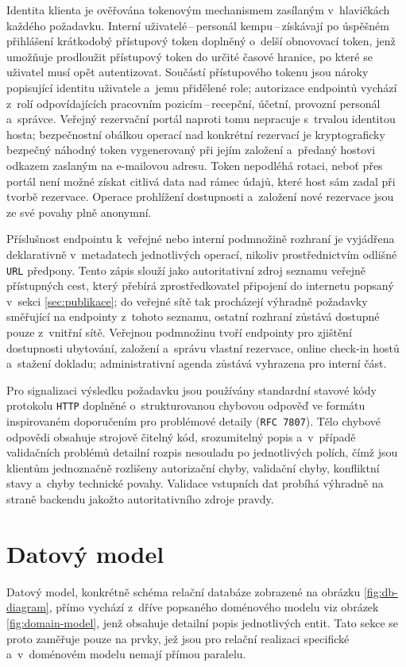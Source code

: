 Identita klienta je ověřována tokenovým mechanismem zasílaným v~hlavičkách každého požadavku.
Interní uživatelé\,--\,personál kempu\,--\,získávají po úspěšném přihlášení krátkodobý přístupový token doplněný o~delší obnovovací token, jenž umožňuje prodloužit přístupový token do určité časové hranice, po které se uživatel musí opět autentizovat.
Součástí přístupového tokenu jsou nároky popisující identitu uživatele a~jemu přidělené role; autorizace endpointů vychází z~rolí odpovídajících pracovním pozicím\,--\,recepční, účetní, provozní personál a~správce.
Veřejný rezervační portál naproti tomu nepracuje s~trvalou identitou hosta; bezpečnostní obálkou operací nad konkrétní rezervací je kryptograficky bezpečný náhodný token vygenerovaný při jejím založení a~předaný hostovi odkazem zaslaným na e-mailovou adresu.
Token nepodléhá rotaci, neboť přes portál není možné získat citlivá data nad rámec údajů, které host sám zadal při tvorbě rezervace.
Operace prohlížení dostupnosti a~založení nové rezervace jsou ze své povahy plně anonymní.

Příslušnost endpointu k~veřejné nebo interní podmnožině rozhraní je vyjádřena deklarativně v~metadatech jednotlivých operací, nikoliv prostřednictvím odlišné \texttt{URL} předpony.
Tento zápis slouží jako autoritativní zdroj seznamu veřejně přístupných cest, který přebírá zprostředkovatel připojení do internetu popsaný v~sekci \ref{sec:publikace}; do veřejné sítě tak procházejí výhradně požadavky směřující na endpointy z~tohoto seznamu, ostatní rozhraní zůstává dostupné pouze z~vnitřní sítě.
Veřejnou podmnožinu tvoří endpointy pro zjištění dostupnosti ubytování, založení a~správu vlastní rezervace, online check-in hostů a~stažení dokladu; administrativní agenda zůstává vyhrazena pro interní část.

Pro signalizaci výsledku požadavku jsou používány standardní stavové kódy protokolu \texttt{HTTP} doplněné o~strukturovanou chybovou odpověď ve formátu inspirovaném doporučením pro problémové detaily (\texttt{RFC~7807}).
Tělo chybové odpovědi obsahuje strojově čitelný kód, srozumitelný popis a~v~případě validačních problémů detailní rozpis nesouladu po jednotlivých polích, čímž jsou klientům jednoznačně rozlišeny autorizační chyby, validační chyby, konfliktní stavy a~chyby technické povahy.
Validace vstupních dat probíhá výhradně na straně backendu jakožto autoritativního zdroje pravdy.

\section{Datový model}
Datový model, konkrétně schéma relační databáze zobrazené na obrázku \ref{fig:db-diagram}, přímo vychází z~dříve popsaného doménového modelu viz obrázek \ref{fig:domain-model}, jenž obsahuje detailní popis jednotlivých entit.
Tato sekce se proto zaměřuje pouze na prvky, jež jsou pro relační realizaci specifické a~v~doménovém modelu nemají přímou paralelu.

